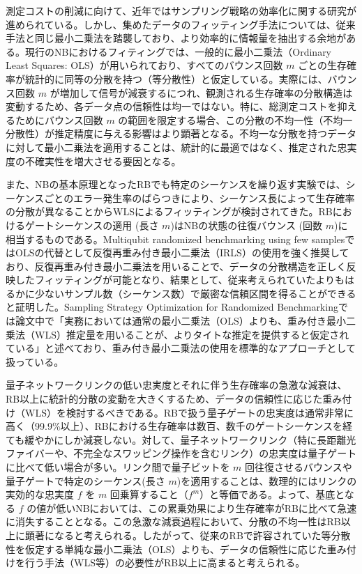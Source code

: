 \documentclass[12pt,a4paper,titlepage,dvipdfmx]{article}
\begin{document}
測定コストの削減に向けて、近年ではサンプリング戦略の効率化に関する研究が進められている\cite{liu2024linkselfie, wang2025learning, li2025fortuna}。しかし、集めたデータのフィッティング手法については、従来手法と同じ最小二乗法を踏襲しており、より効率的に情報量を抽出する余地がある。現行のNBにおけるフィティングでは、一般的に最小二乗法（Ordinary Least Squares: OLS）が用いられており\cite{helsen2023benchmarking}、すべてのバウンス回数 $m$ ごとの生存確率が統計的に同等の分散を持つ（等分散性）と仮定している。実際には、バウンス回数 $m$ が増加して信号が減衰するにつれ、観測される生存確率の分散構造は変動するため、各データ点の信頼性は均一ではない。特に、総測定コストを抑えるためにバウンス回数 $m$ の範囲を限定する場合、この分散の不均一性（不均一分散性）が推定精度に与える影響はより顕著となる。不均一な分散を持つデータに対して最小二乗法を適用することは、統計的に最適ではなく、推定された忠実度の不確実性を増大させる要因となる。

また、NBの基本原理となったRBでも特定のシーケンスを繰り返す実験では、シーケンスごとのエラー発生率のばらつきにより、シーケンス長によって生存確率の分散が異なることからWLSによるフィッティングが検討されてきた。RBにおけるゲートシーケンスの適用 (長さ $m$)はNBの状態の往復バウンス (回数 $m$)に相当するものである。Multiqubit randomized benchmarking using few samples\cite{helsen2019multiqubit}ではOLSの代替として反復再重み付き最小二乗法（IRLS）の使用を強く推奨しており、反復再重み付き最小二乗法を用いることで、データの分散構造を正しく反映したフィッティングが可能となり、結果として、従来考えられていたよりもはるかに少ないサンプル数（シーケンス数）で厳密な信頼区間を得ることができると証明した。Sampling Strategy Optimization for Randomized Benchmarking\cite{itoko2021sampling}では論文中で「実務においては通常の最小二乗法（OLS）よりも、重み付き最小二乗法（WLS）推定量を用いることが、よりタイトな推定を提供すると仮定されている」と述べており、重み付き最小二乗法の使用を標準的なアプローチとして扱っている。

量子ネットワークリンクの低い忠実度とそれに伴う生存確率の急激な減衰は、RB以上に統計的分散の変動を大きくするため、データの信頼性に応じた重み付け（WLS）を検討するべきである。RBで扱う量子ゲートの忠実度は通常非常に高く（99.9\%以上）、RBにおける生存確率は数百、数千のゲートシーケンスを経ても緩やかにしか減衰しない。対して、量子ネットワークリンク（特に長距離光ファイバーや、不完全なスワッピング操作を含むリンク）の忠実度は量子ゲートに比べて低い場合が多い。リンク間で量子ビットを $m$ 回往復させるバウンスや量子ゲートで特定のシーケンス(長さ $m$)を適用することは、数理的にはリンクの実効的な忠実度 $f$ を $m$ 回乗算すること（$f^m$）と等価である。よって、基底となる $f$ の値が低いNBにおいては、この累乗効果により生存確率がRBに比べて急速に消失することとなる。この急激な減衰過程において、分散の不均一性はRB以上に顕著になると考えられる。したがって、従来のRBで許容されていた等分散性を仮定する単純な最小二乗法（OLS）よりも、データの信頼性に応じた重み付けを行う手法（WLS等）の必要性がRB以上に高まると考えられる。
\end{document}
